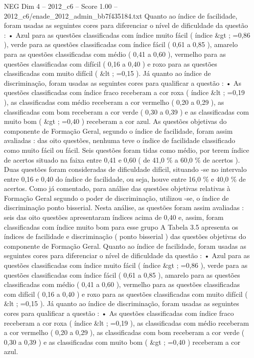 \begin{textsample}{NEG Dim 4 – 2012\_c6 – Score 1.00 – 2012\_c6/enade\_2012\_admin\_bb7f435184.txt}
Quanto ao índice de facilidade, foram usadas as seguintes cores para diferenciar o nível de dificuldade da questão : • Azul para as questões classificadas com índice muito fácil ( índice \&gt ; =0,86 ), verde para as questões classificadas com índice fácil ( 0,61 a 0,85 ), amarelo para as questões classificadas com médio ( 0,41 a 0,60 ), vermelho para as questões classificadas com difícil ( 0,16 a 0,40 ) e roxo para as questões classificadas com muito difícil ( \&lt ; =0,15 ).
Já quanto ao índice de discriminação, foram usadas as seguintes cores para qualificar a questão : • As questões classificadas com índice fraco receberam a cor roxa ( índice \&lt ; =0,19 ), as classificadas com médio receberam a cor vermelho ( 0,20 a 0,29 ), as classificadas com bom receberam a cor verde ( 0,30 a 0,39 ) e as classificadas com muito bom ( \&gt ; =0,40 ) receberam a cor azul.
As questões objetivas do componente de Formação Geral, segundo o índice de facilidade, foram assim avaliadas : das oito questões, nenhuma teve o índice de facilidade classificado como muito fácil ou fácil.
Seis questões foram tidas como médio, por terem índice de acertos situado na faixa entre 0,41 e 0,60 ( de 41,0 \% a 60,0 \% de acertos ).
Duas questões foram consideradas de dificuldade difícil, situando -se no intervalo entre 0,16 e 0,40 do índice de facilidade, ou seja, houve entre 16,0 \% e 40,0 \% de acertos.
Como já comentado, para análise das questões objetivas relativas à Formação Geral segundo o poder de discriminação, utilizou -se, o índice de discriminação ponto bisserial.
Nesta análise, as questões foram assim avaliadas : seis das oito questões apresentaram índices acima de 0,40 e, assim, foram classificadas com índice muito bom para esse grupo A Tabela 3.5 apresenta os índices de facilidade e discriminação ( ponto bisserial ) das questões objetivas do componente de Formação Geral.
Quanto ao índice de facilidade, foram usadas as seguintes cores para diferenciar o nível de dificuldade da questão : • Azul para as questões classificadas com índice muito fácil ( índice \&gt ; =0,86 ), verde para as questões classificadas com índice fácil ( 0,61 a 0,85 ), amarelo para as questões classificadas com médio ( 0,41 a 0,60 ), vermelho para as questões classificadas com difícil ( 0,16 a 0,40 ) e roxo para as questões classificadas com muito difícil ( \&lt ; =0,15 ).
Já quanto ao índice de discriminação, foram usadas as seguintes cores para qualificar a questão : • As questões classificadas com índice fraco receberam a cor roxa ( índice \&lt ; =0,19 ), as classificadas com médio receberam a cor vermelho ( 0,20 a 0,29 ), as classificadas com bom receberam a cor verde ( 0,30 a 0,39 ) e as classificadas com muito bom ( \&gt ; =0,40 ) receberam a cor azul.

\end{textsample}
